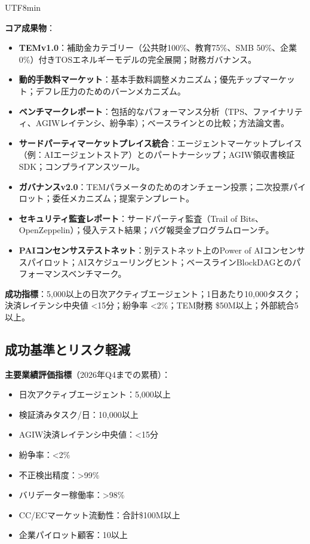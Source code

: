 \documentclass[11pt]{article}
\begin{document}
\begin{CJK}{UTF8}{min}
\begin{itemize}[noitemsep]
\textbf{コア成果物}：
\begin{itemize}[noitemsep]
  \item \textbf{TEMv1.0}：補助金カテゴリー（公共財100\%、教育75\%、SMB 50\%、企業0\%）付きTOSエネルギーモデルの完全展開；財務ガバナンス。
  \item \textbf{動的手数料マーケット}：基本手数料調整メカニズム；優先チップマーケット；デフレ圧力のためのバーンメカニズム。
  \item \textbf{ベンチマークレポート}：包括的なパフォーマンス分析（TPS、ファイナリティ、AGIWレイテンシ、紛争率）；ベースラインとの比較；方法論文書。
  \item \textbf{サードパーティマーケットプレイス統合}：エージェントマーケットプレイス（例：AIエージェントストア）とのパートナーシップ；AGIW領収書検証SDK；コンプライアンスツール。
  \item \textbf{ガバナンスv2.0}：TEMパラメータのためのオンチェーン投票；二次投票パイロット；委任メカニズム；提案テンプレート。
  \item \textbf{セキュリティ監査レポート}：サードパーティ監査（Trail of Bits、OpenZeppelin）；侵入テスト結果；バグ報奨金プログラムローンチ。
  \item \textbf{PAIコンセンサステストネット}：別テストネット上のPower of AIコンセンサスパイロット；AIスケジューリングヒント；ベースラインBlockDAGとのパフォーマンスベンチマーク。
\end{itemize}

\textbf{成功指標}：5,000以上の日次アクティブエージェント；1日あたり10,000タスク；決済レイテンシ中央値 <15分；紛争率 <2\%；TEM財務 \$50M以上；外部統合5以上。

\subsection{成功基準とリスク軽減}

\textbf{主要業績評価指標}（2026年Q4までの累積）：
\begin{itemize}[noitemsep]
  \item 日次アクティブエージェント：5,000以上
  \item 検証済みタスク/日：10,000以上
  \item AGIW決済レイテンシ中央値：<15分
  \item 紛争率：<2\%
  \item 不正検出精度：>99\%
  \item バリデーター稼働率：>98\%
  \item CC/ECマーケット流動性：合計\$100M以上
  \item 企業パイロット顧客：10以上
\end{itemize}


\end{itemize}
\end{CJK}
\end{document}
